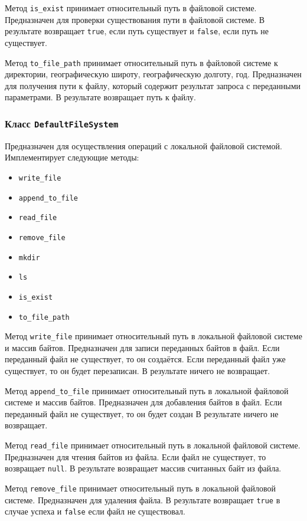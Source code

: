 Метод \texttt{is\_exist} принимает относительный путь в файловой системе.
Предназначен для проверки существования пути в файловой системе.
В результате возвращает \texttt{true}, если путь существует и \texttt{false}, если путь не существует.

Метод \texttt{to\_file\_path} принимает относительный путь в файловой системе к директории, географическую широту, географическую долготу, год.
Предназначен для получения пути к файлу, который содержит результат запроса с переданными параметрами.
В результате возвращает путь к файлу.


\subsubsection{Класс \texttt{DefaultFileSystem}}
Предназначен для осуществления операций с локальной файловой системой.
Имплементирует следующие методы:
\begin{itemize}
    \item \texttt{write\_file}
    \item \texttt{append\_to\_file}
    \item \texttt{read\_file}
    \item \texttt{remove\_file}
    \item \texttt{mkdir}
    \item \texttt{ls}
    \item \texttt{is\_exist}
    \item \texttt{to\_file\_path}
\end{itemize}

Метод \texttt{write\_file} принимает относительный путь в локальной файловой системе и массив байтов.
Предназначен для записи переданных байтов в файл.
Если переданный файл не существует, то он создаётся.
Если переданный файл уже существует, то он будет перезаписан.
В результате ничего не возвращает.

Метод \texttt{append\_to\_file} принимает относительный путь в локальной файловой системе и массив байтов.
Предназначен для добавления байтов в файл.
Если переданный файл не существует, то он будет создан
В результате ничего не возвращает.

Метод \texttt{read\_file} принимает относительный путь в локальной файловой системе.
Предназначен для чтения байтов из файла.
Если файл не существует, то возвращает \texttt{null}.
В результате возвращает массив считанных байт из файла.

Метод \texttt{remove\_file} принимает относительный путь в локальной файловой системе.
Предназначен для удаления файла.
В результате возвращает \texttt{true} в случае успеха и \texttt{false} если файл не существовал.

